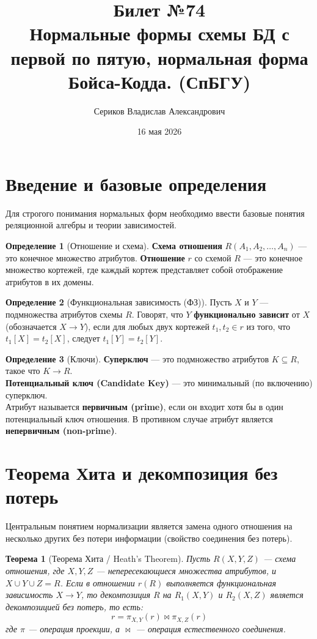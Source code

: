 \documentclass[12pt,a4paper]{article}
\title{Билет №74 \\ \small Нормальные формы схемы БД с первой по пятую, нормальная форма Бойса-Кодда. (СпБГУ)}
\author{Сериков Владислав Александрович}
\date{16 мая 2026}
\theoremstyle{definition}
\newtheorem{definition}{Определение}
\theoremstyle{plain}
\newtheorem{theorem}{Теорема}
\begin{document}
\maketitle
\tableofcontents
\newpage

\section{Введение и базовые определения}

Для строгого понимания нормальных форм необходимо ввести базовые понятия реляционной алгебры и теории зависимостей.

\begin{definition}[Отношение и схема]
\textbf{Схема отношения} $R(A_1, A_2, \dots, A_n)$ — это конечное множество атрибутов.
\textbf{Отношение} $r$ со схемой $R$ — это конечное множество кортежей, где каждый кортеж представляет собой отображение атрибутов в их домены.
\end{definition}

\begin{definition}[Функциональная зависимость (ФЗ)]
Пусть $X$ и $Y$ — подмножества атрибутов схемы $R$. Говорят, что $Y$ \textbf{функционально зависит} от $X$ (обозначается $X \to Y$), если для любых двух кортежей $t_1, t_2 \in r$ из того, что $t_1[X] = t_2[X]$, следует $t_1[Y] = t_2[Y]$.
\end{definition}

\begin{definition}[Ключи]
\textbf{Суперключ} — это подмножество атрибутов $K \subseteq R$, такое что $K \to R$. \\
\textbf{Потенциальный ключ (Candidate Key)} — это минимальный (по включению) суперключ. \\
Атрибут называется \textbf{первичным (prime)}, если он входит хотя бы в один потенциальный ключ отношения. В противном случае атрибут является \textbf{непервичным (non-prime)}.
\end{definition}

\section{Теорема Хита и декомпозиция без потерь}

Центральным понятием нормализации является замена одного отношения на несколько других без потери информации (свойство соединения без потерь).

\begin{theorem}[Теорема Хита / Heath's Theorem]
Пусть $R(X, Y, Z)$ — схема отношения, где $X, Y, Z$ — непересекающиеся множества атрибутов, и $X \cup Y \cup Z = R$. Если в отношении $r(R)$ выполняется функциональная зависимость $X \to Y$, то декомпозиция $R$ на $R_1(X, Y)$ и $R_2(X, Z)$ является декомпозицией без потерь, то есть:
$$r = \pi_{X, Y}(r) \bowtie \pi_{X, Z}(r)$$
где $\pi$ — операция проекции, а $\bowtie$ — операция естественного соединения.
\end{theorem}
\end{document}
